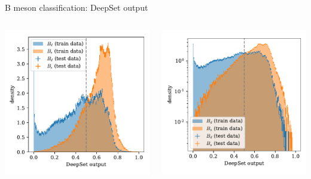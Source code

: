 \documentclass[aspectratio=1610, 10pt]{beamer}
\begin{document}
\begin{frame}{B meson classification: DeepSet output}
  \begin{columns}
    \begin{column}{0.5\textwidth}
      \centering
      \includegraphics[width=\textwidth]{images/B_output.pdf}
    \end{column}
    \begin{column}{0.5\textwidth}
      \centering
      \includegraphics[width=\textwidth]{images/backup/B_output_logy.pdf}
    \end{column}
  \end{columns}
\end{frame}
\end{document}
